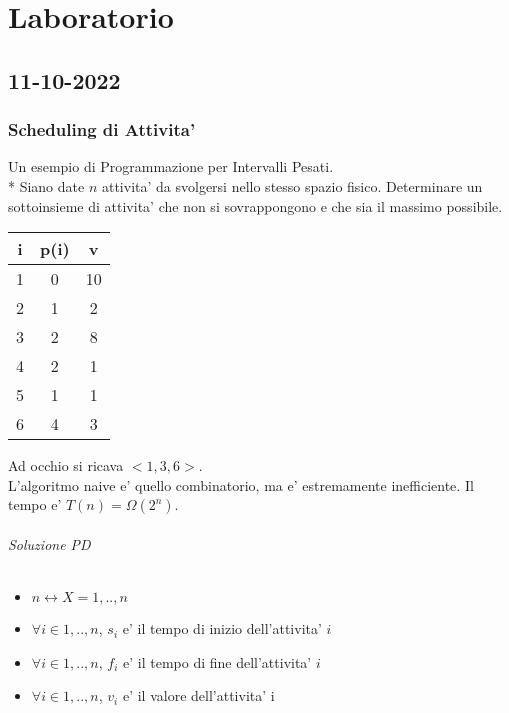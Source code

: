 \part{Laboratorio}
\newcommand{\R}{\mathbb{R}}

\chapter{11-10-2022}

\section{Scheduling di Attivita'}
Un esempio di Programmazione per Intervalli Pesati. \\*
Siano date $n$ attivita' da svolgersi nello stesso spazio fisico.
Determinare un sottoinsieme di attivita' che non si sovrappongono e che sia il massimo possibile.

\begin{center}
    \begin{tabular}{||c c c||}
        \hline
        i & p(i) & v \\
        \hline
        \hline
        1 & 0 & 10 \\
        \hline
        2 & 1 & 2 \\
        \hline
        3 & 2 & 8 \\
        \hline
        4 & 2 & 1 \\
        \hline
        5 & 1 & 1 \\
        \hline
        6 & 4 & 3 \\
        \hline
    \end{tabular}
\end{center}

Ad occhio si ricava $<1, 3, 6>$. \\

L'algoritmo naive e' quello combinatorio, ma e' estremamente inefficiente. Il tempo e' $T(n) = \Omega(2^n)$.

\paragraph{Soluzione PD}

\begin{itemize}
    \item $n \leftrightarrow X = {1,..,n}$
    \item $\forall i \in {1,..,n}$, $s _ {i}$ e' il tempo di inizio dell'attivita' $i$
    \item $\forall i \in {1,..,n}$, $f _ {i}$ e' il tempo di fine dell'attivita' $i$
    \item $\forall i \in {1,..,n}$, $v _ {i}$ e' il valore dell'attivita' i
\end{itemize}

